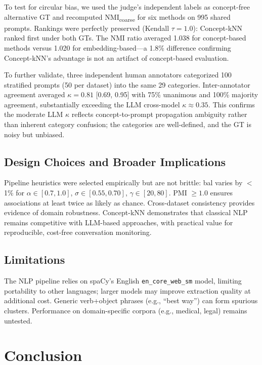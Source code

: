 \documentclass[conference]{IEEEtran}
\begin{document}
To test for circular bias, we used the judge's independent labels as concept-free alternative GT and recomputed NMI\textsubscript{coarse} for six methods on 995 shared prompts. Rankings were perfectly preserved (Kendall $\tau = 1.0$): Concept-kNN ranked first under both GTs. The NMI ratio averaged 1.038 for concept-based methods versus 1.020 for embedding-based---a 1.8\% difference confirming Concept-kNN's advantage is not an artifact of concept-based evaluation.

To further validate, three independent human annotators categorized 100 stratified prompts (50 per dataset) into the same 29 categories. Inter-annotator agreement averaged $\kappa = 0.81$ [0.69, 0.95] with 75\% unanimous and 100\% majority agreement, substantially exceeding the LLM cross-model $\kappa \approx 0.35$. This confirms the moderate LLM $\kappa$ reflects concept-to-prompt propagation ambiguity rather than inherent category confusion; the categories are well-defined, and the GT is noisy but unbiased.

\subsection{Design Choices and Broader Implications}

Pipeline heuristics were selected empirically but are not brittle: bal varies by $<$1\% for $\alpha \in [0.7, 1.0]$, $\sigma \in [0.55, 0.70]$, $\gamma \in [20, 80]$. PMI $\geq 1.0$ ensures associations at least twice as likely as chance. Cross-dataset consistency provides evidence of domain robustness. Concept-kNN demonstrates that classical NLP remains competitive with LLM-based approaches, with practical value for reproducible, cost-free conversation monitoring.

\subsection{Limitations}

The NLP pipeline relies on spaCy's English \texttt{en\_core\_web\_sm} model, limiting portability to other languages; larger models may improve extraction quality at additional cost. Generic verb+object phrases (e.g., ``best way'') can form spurious clusters. Performance on domain-specific corpora (e.g., medical, legal) remains untested.

\section{Conclusion}
\end{document}
